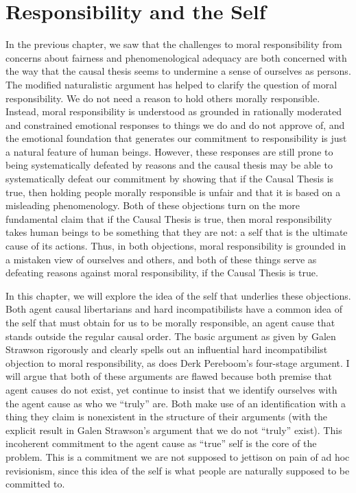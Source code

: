 \documentclass[phd,12pt,oneside,paper=letterpaper]{ubcthesis}
\begin{document}
\chapter{Responsibility and the Self}
In the previous chapter, we saw that the challenges to moral responsibility from concerns about fairness and phenomenological adequacy are both concerned with the way that the causal thesis seems to undermine a sense of ourselves as persons. The modified naturalistic argument has helped to clarify the question of moral responsibility. We do not need a reason to hold others morally responsible. Instead, moral responsibility is understood as grounded in rationally moderated and constrained emotional responses to things we do and do not approve of, and the emotional foundation that generates our commitment to responsibility is just a natural feature of human beings. However, these responses are still prone to being systematically defeated by reasons and the causal thesis may be able to systematically defeat our commitment by showing that if the Causal Thesis is true, then holding people morally responsible is unfair and that it is based on a misleading phenomenology. Both of these objections turn on the more fundamental claim that if the Causal Thesis is true, then moral responsibility takes human beings to be something that they are not: a self that is the ultimate cause of its actions. Thus, in both objections, moral responsibility is grounded in a mistaken view of ourselves and others, and both of these things serve as defeating reasons against moral responsibility, if the Causal Thesis is true. 

In this chapter, we will explore the idea of the self that underlies these objections. Both agent causal libertarians and hard incompatibilists have a common idea of the self that must obtain for us to be morally responsible, an agent cause that stands outside the regular causal order. The basic argument as given by Galen Strawson rigorously and clearly spells out an influential hard incompatibilist objection to moral responsibility, as does Derk Pereboom's four-stage argument. I will argue that both of these arguments are flawed because both premise that agent causes do not exist, yet continue to insist that we identify ourselves with the agent cause as who we ``truly'' are. Both make use of an identification with a thing they claim is nonexistent in the structure of their arguments (with the explicit result in Galen Strawson's argument that we do not ``truly'' exist). This incoherent commitment to the agent cause as ``true'' self is the core of the problem. This is a commitment we are not supposed to jettison on pain of ad hoc revisionism, since this idea of the self is what people are naturally supposed to be committed to.
\end{document}
